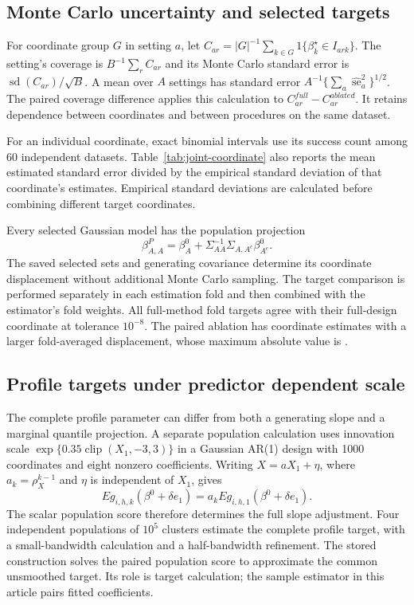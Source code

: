 \subsection{Monte Carlo uncertainty and selected targets}

For coordinate group $G$ in setting $a$, let
$C_{ar}=|G|^{-1}\sum_{k\in G}1\{\beta_k^\star\in I_{ark}\}$.
The setting's coverage is $B^{-1}\sum_r C_{ar}$ and its Monte Carlo
standard error is $\operatorname{sd}(C_{ar})/\sqrt B$.
A mean over $A$ settings has standard error
$A^{-1}\{\sum_a\widehat{\operatorname{se}}_a^2\}^{1/2}$.
The paired coverage difference applies this calculation to
$C_{ar}^{full}-C_{ar}^{ablated}$. It retains dependence between
coordinates and between procedures on the same dataset.

For an individual coordinate, exact binomial intervals use its
success count among 60 independent datasets.
Table~\ref{tab:joint-coordinate} also reports the mean estimated
standard error divided by the empirical standard deviation of that
coordinate's estimates. Empirical standard deviations are calculated
before combining different target coordinates.

Every selected Gaussian model has the population projection
\[
 \beta_{A,A}^P=\beta_A^0+
                    \Sigma_{AA}^{-1}\Sigma_{A,A^c}\beta_{A^c}^0.
\]
The saved selected sets and generating covariance determine its
coordinate displacement without additional Monte Carlo sampling.
The target comparison is performed separately in each estimation
fold and then combined with the estimator's fold weights. All
full-method fold targets agree with their full-design coordinate
at tolerance $10^{-8}$. The paired ablation has
\JointAblationShiftCount{} coordinate estimates with a larger
fold-averaged displacement, whose maximum absolute value is
\JointAblationMaxShift{}.

\begingroup\small


\endgroup

\subsection{Profile targets under predictor dependent scale}

The complete profile parameter can differ from both a generating
slope and a marginal quantile projection. A separate population
calculation uses innovation scale
$\exp\{0.35\operatorname{clip}(X_1,-3,3)\}$ in a Gaussian AR(1)
design with 1000 coordinates and eight nonzero coefficients.
Writing $X=aX_1+\eta$, where $a_k=\rho_X^{k-1}$ and $\eta$ is
independent of $X_1$, gives
\[
 E g_{i,h,k}(\beta^0+\delta e_1)
       =a_k E g_{i,h,1}(\beta^0+\delta e_1).
\]
The scalar population score therefore determines the full slope
adjustment. Four independent populations of $10^5$ clusters estimate
the complete profile target, with a small-bandwidth calculation and
a half-bandwidth refinement. The stored construction solves the
paired population score to approximate the common unsmoothed target.
Its role is target calculation; the sample estimator in this article
pairs fitted coefficients.

